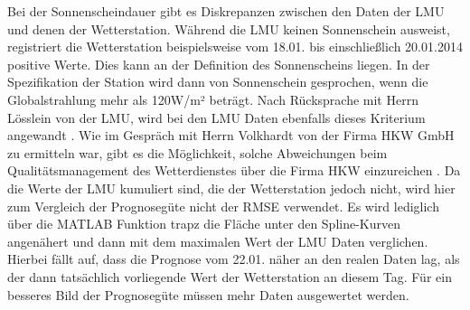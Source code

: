 Bei der Sonnenscheindauer gibt es Diskrepanzen zwischen den Daten der LMU und denen der Wetterstation. Während die LMU keinen Sonnenschein ausweist, registriert die Wetterstation beispielsweise vom 18.01. bis einschließlich 20.01.2014 positive Werte. Dies kann an der Definition des Sonnenscheins liegen. In der Spezifikation der Station wird dann von Sonnenschein gesprochen, wenn die Globalstrahlung mehr als 120W/m² beträgt. Nach Rücksprache mit Herrn Lösslein von der LMU, wird bei den LMU Daten ebenfalls dieses Kriterium angewandt \cite{loesslein}. Wie im Gespräch mit Herrn Volkhardt von der Firma HKW GmbH zu ermitteln war, gibt es die Möglichkeit, solche Abweichungen beim Qualitätsmanagement des Wetterdienstes über die Firma HKW einzureichen \cite{TelHKW}. Da die Werte der LMU kumuliert sind, die der Wetterstation jedoch nicht, wird hier zum Vergleich der Prognosegüte nicht der RMSE verwendet. Es wird lediglich über die MATLAB Funktion \textsf{trapz} die Fläche unter den Spline-Kurven angenähert und dann mit dem maximalen Wert der LMU Daten verglichen. Hierbei fällt auf, dass die Prognose vom 22.01. näher an den realen Daten lag, als der dann tatsächlich vorliegende Wert der Wetterstation an diesem Tag. Für ein besseres Bild der Prognosegüte müssen mehr Daten ausgewertet werden.  
